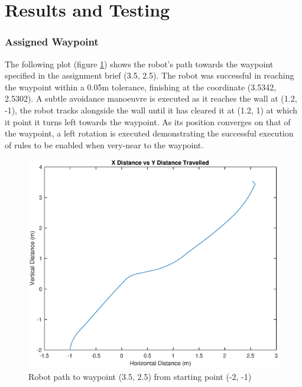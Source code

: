 \documentclass[10pt]{article}
\newcommand{\graphScale}{0.4}
\begin{document}
\section{Results and Testing}
\subsubsection{Assigned Waypoint}
The following plot (figure \ref{fig:ToWaypoint}) shows the robot's path towards the waypoint specified in the assignment brief (3.5, 2.5).
The robot was successful in reaching the waypoint within a 0.05m tolerance, finishing at the coordinate (3.5342, 2.5302).
A subtle avoidance manoeuvre is executed as it reaches the wall at (1.2, -1), the robot tracks alongside the wall until it has cleared it at (1.2, 1) at which it point it turns left towards the waypoint.
As its position converges on that of the waypoint, a left rotation is executed demonstrating the successful execution of rules to be enabled when very-near to the waypoint. 
\begin{figure}[H]
    \centering
\includegraphics[scale=\graphScale]{./figures/ToWaypoint.eps}
\caption{Robot path to waypoint (3.5, 2.5) from starting point (-2, -1)}
\label{fig:ToWaypoint}
\end{figure}
\end{document}

